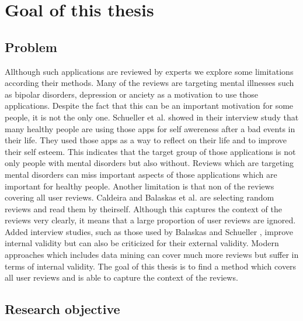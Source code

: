 \chapter{Goal of this thesis}
\label{ch:goal}
\section{Problem}
\label{sec:problem}

Allthough such applications are reviewed by experts we explore some limitations according their methods.
Many of the reviews are targeting mental illnesses such as bipolar disorders, depression or anciety as a motivation to use those applications.
Despite the fact that this can be an important motivation for some people, it is not the only one.
Schueller et al. \cite{schueller2021UnderstandingPU} showed in their interview study that many healthy people are using those apps for self awereness after a bad events in their life.
They used those apps as a way to reflect on their life and to improve their self esteem.
This indicates that the target group of those applications is not only people with mental disorders but also without.
Reviews which are targeting mental disorders can miss important aspects of those applications which are important for healthy people.
Another limitation is that non of the reviews covering all user reviews.
Caldeira \cite{caldeira_mobile_nodate} and Balaskas et al. \cite{Balaskas2022UnderstandingUP} are selecting random reviews and read them by theirself.
Although this captures the context of the reviews very clearly, it means that a large proportion of user reviews are ignored.
Added interview studies, such as those used by Balaskas \cite{Balaskas2022UnderstandingUP} and Schueller \cite{Balaskas2022UnderstandingUP},
improve internal validity but can also be criticized for their external validity.
Modern approaches which includes data mining can cover much more reviews but suffer in terms of internal validity.
The goal of this thesis is to find a method which covers all user reviews and is able to capture the context of the reviews.

\section{Research objective}
\label{sec:research-objective}

